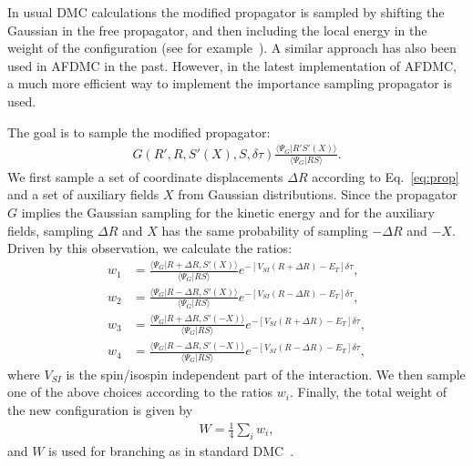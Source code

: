 \documentclass[aps,prc,twocolumn,superscriptaddress,floatfix]{revtex4-1}
\newcommand{\red}[1]{\protect\textcolor{red}{#1}}
\begin{document}
In usual DMC calculations the modified propagator is sampled by shifting the Gaussian in
the free propagator, and then including the local energy in the weight of the configuration
(see for example~\red{\cite{XXX}}). A similar approach has also been used in AFDMC in the past. 
However, in the latest implementation of AFDMC, a much more efficient way to implement the
importance sampling propagator is used.

The goal is to sample the modified propagator:
\begin{align}
G(R',R,S'(X),S,\delta\tau)\frac{\langle\Psi_G|R'S'(X)\rangle}{\langle\Psi_G|RS\rangle} .
\end{align}
We first sample a set of coordinate displacements $\Delta R$ according
to Eq.~\ref{eq:prop} and a
set of auxiliary fields $X$ from Gaussian distributions.
Since the propagator $G$ implies the Gaussian sampling for the kinetic energy and 
for the auxiliary fields, sampling $\Delta R$ and $X$ has the same probability
of sampling $-\Delta R$ and $-X$.
Driven by this observation, we calculate the ratios:
\begin{align}
w_1&=\frac{\langle\Psi_G|R+\Delta R,S'(X)\rangle}{\langle\Psi_G|RS\rangle}e^{-[V_{SI}(R+\Delta R)-E_T]\delta\tau},
\nonumber \\
w_2&=\frac{\langle\Psi_G|R-\Delta R,S'(X)\rangle}{\langle\Psi_G|RS\rangle}e^{-[V_{SI}(R-\Delta R)-E_T]\delta\tau},
\nonumber \\
w_3&=\frac{\langle\Psi_G|R+\Delta R,S'(-X)\rangle}{\langle\Psi_G|RS\rangle}e^{-[V_{SI}(R+\Delta R)-E_T]\delta\tau},
\nonumber \\
w_4&=\frac{\langle\Psi_G|R-\Delta R,S'(-X)\rangle}{\langle\Psi_G|RS\rangle}e^{-[V_{SI}(R-\Delta R)-E_T]\delta\tau},
\label{eq:w_i}
\end{align}
where $V_{SI}$ is the spin/isospin independent part of the interaction.
We then sample one of the above choices according to the ratios $w_i$.
Finally, the total weight of the new configuration is given by
\begin{align}
W=\frac{1}{4}\sum_i w_i ,
\end{align}
and $W$ is used for branching as in standard DMC~\cite{Carlson:2015}.
\end{document}
